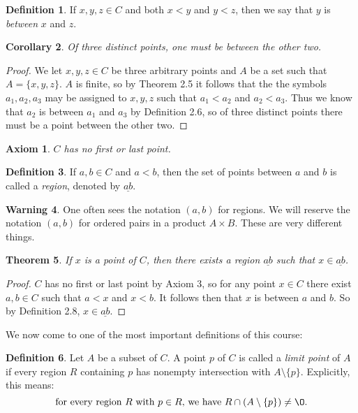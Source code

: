 \documentclass[12pt]{article}
\renewcommand{\emptyset}{\O}
\renewcommand{\_}[1]{\underline{ #1 }}
\newtheorem{theorem}{Theorem}[section]
\newtheorem{corollary}[theorem]{Corollary}
\newtheorem{axiom}{Axiom}
\theoremstyle{definition}
\newtheorem{definition}[theorem]{Definition}
\newtheorem{warning}[theorem]{Warning}
\numberwithin{equation}{subsection}
\begin{document}
\begin{definition}  If $x, y, z \in C$ and both $x < y$ and $y < z$, then we say that $y$ is \emph{between} $x$ and $z$.
\end{definition}

\begin{corollary}  Of three distinct points, one must be between the other two.
\end{corollary}
\begin{proof}
We let $x,y,z \in C$ be three arbitrary points and $A$ be a set such that $A = \{x,y,z\}$. $A$ is finite, so by Theorem 2.5 it follows that the the symbols $a_1, a_2, a_3$ may be assigned to $x, y, z$ such that $a_1 < a_2$ and $a_2 < a_3$. Thus we know that $a_2$ is between $a_1$ and $a_3$ by Definition 2.6, so of three distinct points there must be a point between the other two. 
\end{proof}

\begin{axiom}  $C$ has no first or last point.
\end{axiom}

\begin{definition} If $a,b\in C$ and $a < b$, then the set of points between $a$ and $b$ is called a \emph{region}, denoted by $\_{ab}$.  
\end{definition}

\begin{warning}  One often sees the notation $(a, b)$ for regions.  We will reserve the notation $(a, b)$ for ordered pairs in a product $A \times B$.  These are very different things.  
\end{warning}

\begin{theorem} If $x$ is a point of $C$, then there exists a region $\_{ab}$ such that $x \in \_{ab}$.
\end{theorem}

\begin{proof}
$C$ has no first or last point by Axiom 3, so for any point $x \in C$ there exist $a,b \in C$ such that $a < x$ and $x < b$. It follows then that $x$ is between $a$ and $b$. So by Definition 2.8, $x \in \_{ab}$.
\end{proof}

We now come to one of the most important definitions of this course:

\begin{definition}
Let $A$ be a subset of $C$.  A point $p$ of $C$ is called a \emph{limit point} of $A$ if every region $R$ containing $p$ has nonempty intersection with $A \setminus \{p\}$.  Explicitly, this means:
\[
\text{for every region $R$ with $p \in R$, we have $R \cap (A \setminus \{p \}) \neq \emptyset$.}
\]
\end{definition}
\end{document}
